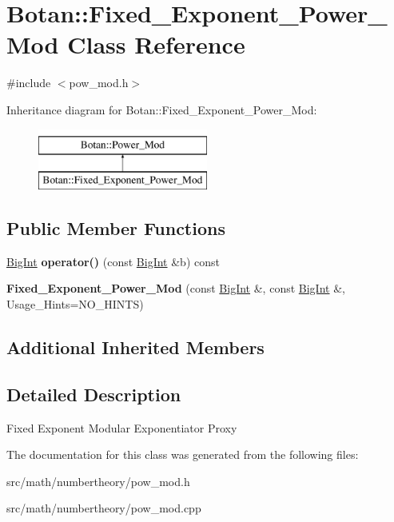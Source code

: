 \hypertarget{classBotan_1_1Fixed__Exponent__Power__Mod}{\section{Botan\-:\-:Fixed\-\_\-\-Exponent\-\_\-\-Power\-\_\-\-Mod Class Reference}
\label{classBotan_1_1Fixed__Exponent__Power__Mod}
}


{\ttfamily \#include $<$pow\-\_\-mod.\-h$>$}

Inheritance diagram for Botan\-:\-:Fixed\-\_\-\-Exponent\-\_\-\-Power\-\_\-\-Mod\-:\begin{figure}[H]
\begin{center}
\leavevmode
\includegraphics[height=2.000000cm]{classBotan_1_1Fixed__Exponent__Power__Mod}
\end{center}
\end{figure}
\subsection*{Public Member Functions}
\begin{DoxyCompactItemize}
\item 
\hypertarget{classBotan_1_1Fixed__Exponent__Power__Mod_a4ee84aa3e5073b42ab6018db689af7a9}{\hyperlink{classBotan_1_1BigInt}{Big\-Int} {\bfseries operator()} (const \hyperlink{classBotan_1_1BigInt}{Big\-Int} \&b) const }\label{classBotan_1_1Fixed__Exponent__Power__Mod_a4ee84aa3e5073b42ab6018db689af7a9}

\item 
\hypertarget{classBotan_1_1Fixed__Exponent__Power__Mod_a3b17f9af6e694fc47ad0bd0c0bf0abe7}{{\bfseries Fixed\-\_\-\-Exponent\-\_\-\-Power\-\_\-\-Mod} (const \hyperlink{classBotan_1_1BigInt}{Big\-Int} \&, const \hyperlink{classBotan_1_1BigInt}{Big\-Int} \&, Usage\-\_\-\-Hints=N\-O\-\_\-\-H\-I\-N\-T\-S)}\label{classBotan_1_1Fixed__Exponent__Power__Mod_a3b17f9af6e694fc47ad0bd0c0bf0abe7}

\end{DoxyCompactItemize}
\subsection*{Additional Inherited Members}


\subsection{Detailed Description}
Fixed Exponent Modular Exponentiator Proxy 

The documentation for this class was generated from the following files\-:\begin{DoxyCompactItemize}
\item 
src/math/numbertheory/pow\-\_\-mod.\-h\item 
src/math/numbertheory/pow\-\_\-mod.\-cpp\end{DoxyCompactItemize}
